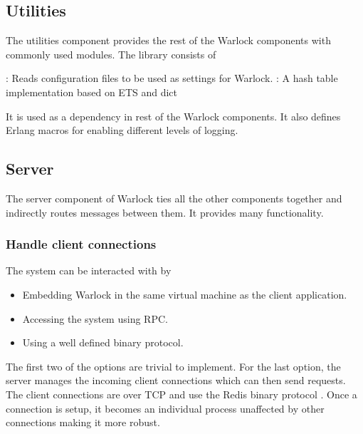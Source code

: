 \subsection{Utilities}

The utilities component provides the rest of the Warlock components with
commonly used modules. The library consists of

\begin{itemize}
    : Reads configuration files to be used as
    settings for Warlock.
    : A hash table implementation based on ETS%
    and dict%
\end{itemize}

It is used as a dependency in rest of the Warlock components. It also defines
Erlang macros%
for enabling different levels of logging.

\subsection{Server}

The server component of Warlock ties all the other components together and
indirectly routes messages between them. It provides many functionality.

\subsubsection{Handle client connections}

The system can be interacted with by

\begin{itemize}
  \item Embedding Warlock in the same virtual machine as the
    client application.
  \item Accessing the system using RPC.
  \item Using a well defined binary protocol.
\end{itemize}

The first two of the options are trivial to implement. For the last option, the
server manages the incoming client connections which can then send requests. The
client connections are over TCP and use the Redis binary protocol
\citep{RedisProtocol}%
. Once a connection is setup, it becomes an individual process unaffected by
other connections making it more robust.

